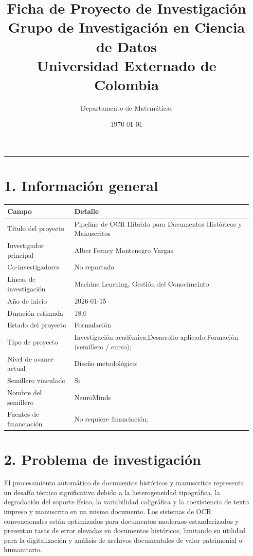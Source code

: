 \documentclass[a4paper,12pt]{article}
\title{
\vspace{-8mm}
\textbf{\textcolor{ExternadoGreen}{Ficha de Proyecto de Investigación}}\\
\large \textcolor{ExternadoDark}{Grupo de Investigación en Ciencia de Datos}\\
\large \textcolor{ExternadoDark}{Universidad Externado de Colombia}
}
\author{\textcolor{ExternadoDark}{Departamento de Matemáticas}}
\date{\textcolor{ExternadoDark}{\today}}
\begin{document}
\maketitle
\vspace{-3mm}
\noindent\textcolor{ExternadoDark}{\rule{\textwidth}{0.6pt}}

\section*{1. Información general}
\begin{longtable}{p{4.2cm} p{10.4cm}}
\toprule
\textbf{Campo} & \textbf{Detalle} \\
\midrule
Título del proyecto & Pipeline de OCR Híbrido para Documentos Históricos y Manuscritos \\
Investigador principal & Alber Ferney Montenegro Vargas \\
Co-investigadores & No reportado \\
Líneas de investigación & Machine Learning, Gestión del Conocimeinto \\
Año de inicio & 2026-01-15 \\
Duración estimada & 18.0 \\
Estado del proyecto & Formulación \\
Tipo de proyecto & Investigación académica;Desarrollo aplicado;Formación (semillero / curso); \\
Nivel de avance actual & Diseño metodológico; \\
Semillero vinculado & Si \\
Nombre del semillero & NeuroMinds \\
Fuentes de financiación & No requiere financiación; \\
\bottomrule
\end{longtable}

\section*{2. Problema de investigación}
El procesamiento automático de documentos históricos y manuscritos representa un desafío técnico significativo debido a la heterogeneidad tipográfica, la degradación del soporte físico, la variabilidad caligráfica y la coexistencia de texto impreso y manuscrito en un mismo documento. Los sistemas de OCR convencionales están optimizados para documentos modernos estandarizados y presentan tasas de error elevadas en documentos históricos, limitando su utilidad para la digitalización y análisis de archivos documentales de valor patrimonial o humanitario.
\end{document}
